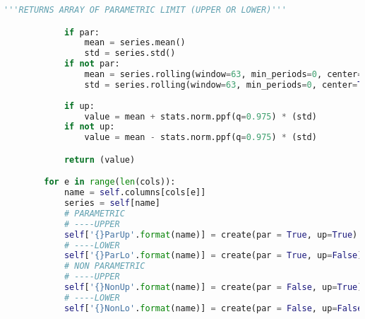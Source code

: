 \begin{lstlisting}[language=Python]
            '''RETURNS ARRAY OF PARAMETRIC LIMIT (UPPER OR LOWER)'''

            if par:
                mean = series.mean()
                std = series.std()
            if not par:
                mean = series.rolling(window=63, min_periods=0, center=True).mean()
                std = series.rolling(window=63, min_periods=0, center=True).std()
            
            if up:
                value = mean + stats.norm.ppf(q=0.975) * (std)
            if not up:
                value = mean - stats.norm.ppf(q=0.975) * (std)

            return (value)

        for e in range(len(cols)):
            name = self.columns[cols[e]]
            series = self[name]
            # PARAMETRIC
            # ----UPPER
            self['{}ParUp'.format(name)] = create(par = True, up=True)
            # ----LOWER
            self['{}ParLo'.format(name)] = create(par = True, up=False)
            # NON PARAMETRIC
            # ----UPPER
            self['{}NonUp'.format(name)] = create(par = False, up=True)
            # ----LOWER
            self['{}NonLo'.format(name)] = create(par = False, up=False)
        
\end{lstlisting}